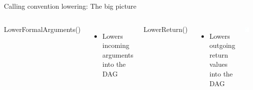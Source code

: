 
\begin{frame}[fragile]{Calling convention lowering: The big picture}

\begin{columns}[t]
    LowerFormalArguments()
    \begin{itemize}
        \item Lowers incoming arguments into the DAG
    \end{itemize}

    LowerReturn()
    \begin{itemize}
        \item Lowers outgoing return values into the DAG
    \end{itemize}
    
    \begin{block}{}
        \vspace{-5ex}
        \includegraphics[width = 1.0\textwidth]{examples/ex1b/ex1b-pre-isel.pdf}
    \end{block}
\end{columns}    

\end{frame}

